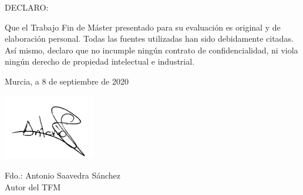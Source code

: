 DECLARO:

Que el Trabajo Fin de Máster presentado para su evaluación es original y de elaboración personal. Todas las fuentes utilizadas han sido debidamente citadas. Así mismo, declaro que no incumple ningún contrato de confidencialidad, ni viola ningún derecho de propiedad intelectual e industrial.

\begin{center}
    Murcia, a 8 de septiembre de 2020

    \includegraphics[width=0.3\textwidth]{./images/firma}

    Fdo.: Antonio Saavedra Sánchez \\
    Autor del TFM

\end{center}





\newpage